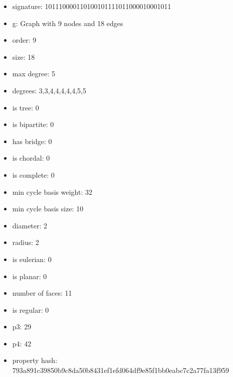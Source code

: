 \newpage
\begin{figure}
\end{figure}
\begin{itemize}
\item signature: 101110000110100101111011000010001011
\item g: Graph with 9 nodes and 18 edges
\item order: 9
\item size: 18
\item max degree: 5
\item degrees: 3,3,4,4,4,4,4,5,5
\item is tree: 0
\item is bipartite: 0
\item has bridge: 0
\item is chordal: 0
\item is complete: 0
\item min cycle basis weight: 32
\item min cycle basis size: 10
\item diameter: 2
\item radius: 2
\item is eulerian: 0
\item is planar: 0
\item number of faces: 11
\item is regular: 0
\item p3: 29
\item p4: 42
\item property hash: 793a891c39850b9c8da50b8431ef1efd064df9e85f1bb0eabc7c2a77fa13f959
\end{itemize}
